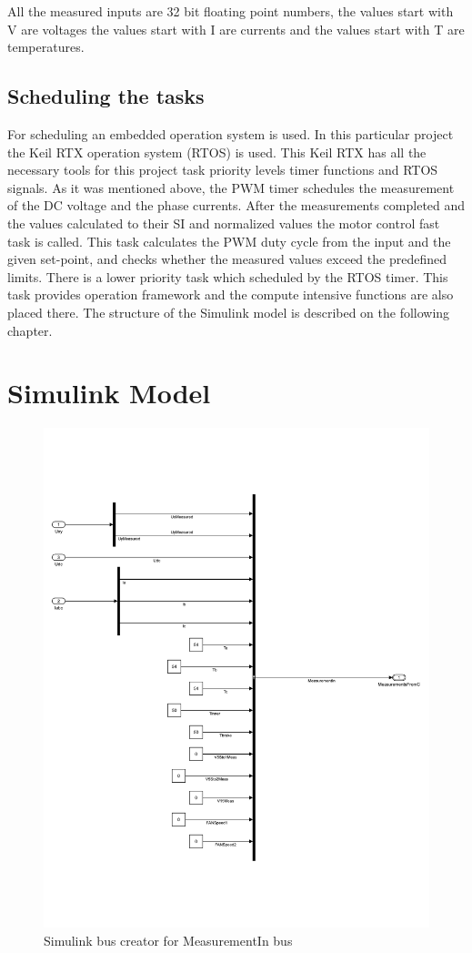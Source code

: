 All the measured inputs are 32 bit floating point numbers, the values start with V are voltages the values start with I are currents and the values start with T are temperatures.

\subsection{Scheduling the tasks}
For scheduling an embedded operation system is used. In this particular project the Keil RTX operation system (RTOS) is used. This Keil RTX has all the necessary tools for this project task priority levels timer functions and RTOS signals. As it was mentioned above, the PWM timer schedules the measurement of the DC voltage and the phase currents. After the measurements completed and the values calculated to their SI and normalized values the motor control fast task is called. This task calculates the PWM duty cycle from the input and the given set-point, and checks whether the measured values exceed the predefined limits. 
There is a lower priority task which scheduled by the RTOS timer. This task provides operation framework and the compute intensive functions are also placed there. The structure of the Simulink model is described on the following chapter.



\section{Simulink Model}

\begin{figure}[!h]
\centering
\includegraphics[width=0.9\columnwidth]{figures/inputs}

\caption{Simulink bus creator for MeasurementIn bus}
\label{fig:fig_MeasurementIn}
\end{figure}

